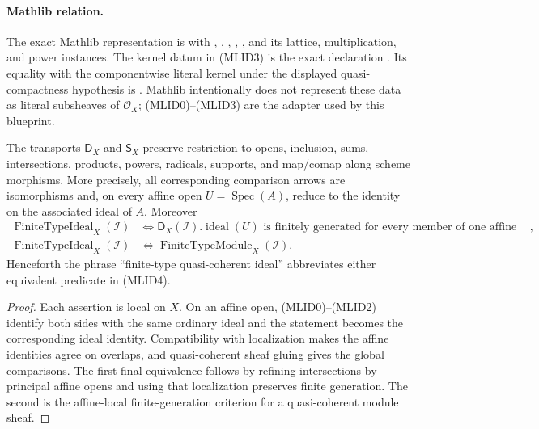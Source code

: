 \begin{definition}
  \paragraph{Mathlib relation.}
  The exact Mathlib representation is
  \texttt{} with
  \texttt{},
  \texttt{},
  \texttt{},
  \texttt{},
  \texttt{}, and its lattice, multiplication, and power
  instances.  The kernel datum in (MLID3) is the exact declaration
  \texttt{}.  Its equality with
  the componentwise literal kernel under the displayed quasi-compactness
  hypothesis is
  \texttt{}.  Mathlib
  intentionally does not represent these data as literal
  subsheaves of $\mathcal O_X$; (MLID0)--(MLID3) are the adapter used by this
  blueprint.
\end{definition}

\begin{lemma}
  \label{lemma:nagata-ideal-sheaf-data-adapter}

  The transports $\mathsf D_X$ and $\mathsf S_X$ preserve restriction to
  opens, inclusion, sums, intersections, products, powers, radicals,
  supports, and map/comap along scheme morphisms.  More precisely, all
  corresponding comparison arrows are isomorphisms and, on every affine open
  $U=\operatorname{Spec}(A)$, reduce to the identity on the associated ideal
  of $A$.  Moreover
  \[
  \begin{aligned}
    \operatorname{FiniteTypeIdeal}_X(\mathcal I)
      &\Longleftrightarrow
        \mathsf D_X(\mathcal I).\operatorname{ideal}(U)
          \text{ is finitely generated for every member of one affine cover},\\
    \operatorname{FiniteTypeIdeal}_X(\mathcal I)
      &\Longleftrightarrow
        \operatorname{FiniteTypeModule}_X(\mathcal I).
  \end{aligned}
                                                                    \tag{MLID4}
  \]
  Henceforth the phrase ``finite-type quasi-coherent ideal'' abbreviates
  either equivalent predicate in (MLID4).
\end{lemma}

\begin{proof}
  Each assertion is local on $X$.  On an affine open, (MLID0)--(MLID2)
  identify both sides with the same ordinary ideal and the statement becomes
  the corresponding ideal identity.  Compatibility with localization makes
  the affine identities agree on overlaps, and quasi-coherent sheaf gluing
  gives the global comparisons.  The first final equivalence follows by
  refining intersections by principal affine opens and using that
  localization preserves finite generation.  The second is the affine-local
  finite-generation criterion for a quasi-coherent module sheaf.
\end{proof}

